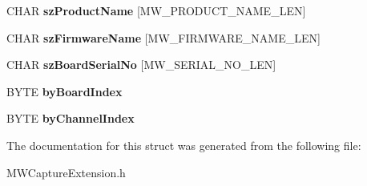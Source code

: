 \begin{DoxyCompactItemize}
\item 
\hypertarget{struct__MWCAP__CHANNEL__INFO_a9e48279f8b23371aa5b1b13eef9904ad}{C\-H\-A\-R {\bfseries sz\-Product\-Name} \mbox{[}M\-W\-\_\-\-P\-R\-O\-D\-U\-C\-T\-\_\-\-N\-A\-M\-E\-\_\-\-L\-E\-N\mbox{]}}\label{struct__MWCAP__CHANNEL__INFO_a9e48279f8b23371aa5b1b13eef9904ad}

\item 
\hypertarget{struct__MWCAP__CHANNEL__INFO_a4a7740dfc03c0c85ad77da466694c63c}{C\-H\-A\-R {\bfseries sz\-Firmware\-Name} \mbox{[}M\-W\-\_\-\-F\-I\-R\-M\-W\-A\-R\-E\-\_\-\-N\-A\-M\-E\-\_\-\-L\-E\-N\mbox{]}}\label{struct__MWCAP__CHANNEL__INFO_a4a7740dfc03c0c85ad77da466694c63c}

\item 
\hypertarget{struct__MWCAP__CHANNEL__INFO_a256730a309e52a1aacbda5cb0a25c0cf}{C\-H\-A\-R {\bfseries sz\-Board\-Serial\-No} \mbox{[}M\-W\-\_\-\-S\-E\-R\-I\-A\-L\-\_\-\-N\-O\-\_\-\-L\-E\-N\mbox{]}}\label{struct__MWCAP__CHANNEL__INFO_a256730a309e52a1aacbda5cb0a25c0cf}

\item 
\hypertarget{struct__MWCAP__CHANNEL__INFO_a92717b724836d56e37bea8aaf34c4ef6}{B\-Y\-T\-E {\bfseries by\-Board\-Index}}\label{struct__MWCAP__CHANNEL__INFO_a92717b724836d56e37bea8aaf34c4ef6}

\item 
\hypertarget{struct__MWCAP__CHANNEL__INFO_ae5f7e0653dfd5b0516ad24e985b09d28}{B\-Y\-T\-E {\bfseries by\-Channel\-Index}}\label{struct__MWCAP__CHANNEL__INFO_ae5f7e0653dfd5b0516ad24e985b09d28}

\end{DoxyCompactItemize}


The documentation for this struct was generated from the following file\-:\begin{DoxyCompactItemize}
\item 
M\-W\-Capture\-Extension.\-h\end{DoxyCompactItemize}

